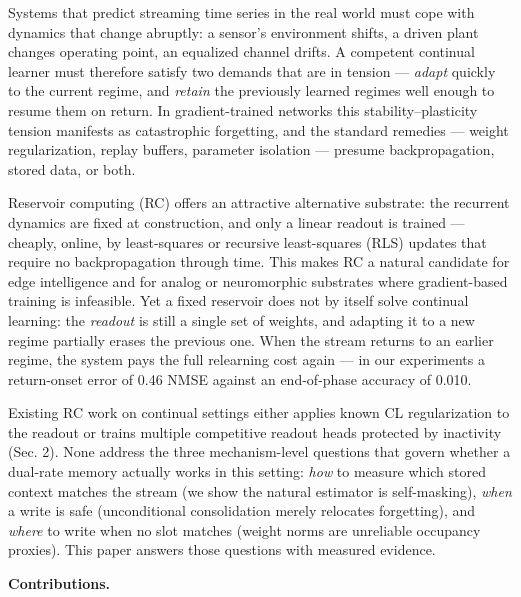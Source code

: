 \documentclass[11pt]{article}
\begin{document}
Systems that predict streaming time series in the real world must cope
with dynamics that change abruptly: a sensor's environment shifts, a
driven plant changes operating point, an equalized channel drifts. A
competent continual learner must therefore satisfy two demands that are
in tension --- \emph{adapt} quickly to the current regime, and \emph{retain} the
previously learned regimes well enough to resume them on return. In
gradient-trained networks this stability--plasticity tension manifests
as catastrophic forgetting, and the standard remedies --- weight
regularization, replay buffers, parameter isolation --- presume
backpropagation, stored data, or both.

Reservoir computing (RC) offers an attractive alternative substrate:
the recurrent dynamics are fixed at construction, and only a linear
readout is trained --- cheaply, online, by least-squares or recursive
least-squares (RLS) updates that require no backpropagation through
time. This makes RC a natural candidate for edge intelligence and for
analog or neuromorphic substrates where gradient-based training is
infeasible. Yet a fixed reservoir does not by itself solve continual
learning: the \emph{readout} is still a single set of weights, and adapting
it to a new regime partially erases the previous one. When the stream
returns to an earlier regime, the system pays the full relearning cost
again --- in our experiments a return-onset error of 0.46 NMSE against
an end-of-phase accuracy of 0.010.

Existing RC work on continual settings either applies known CL
regularization to the readout or trains multiple competitive readout
heads protected by inactivity (Sec. 2). None address the three
mechanism-level questions that govern whether a dual-rate memory
actually works in this setting: \emph{how} to measure which stored context
matches the stream (we show the natural estimator is self-masking),
\emph{when} a write is safe (unconditional consolidation merely relocates
forgetting), and \emph{where} to write when no slot matches (weight norms
are unreliable occupancy proxies). This paper answers those questions
with measured evidence.

\textbf{Contributions.}
\end{document}
